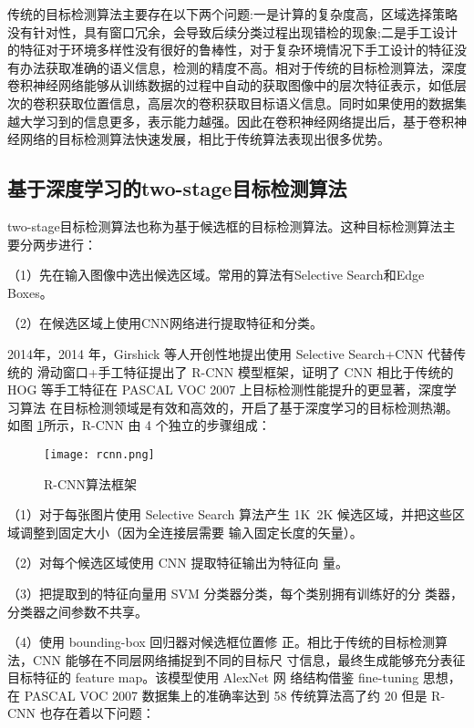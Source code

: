 传统的目标检测算法主要存在以下两个问题:一是计算的复杂度高，区域选择策略没有针对性，具有窗口冗余，会导致后续分类过程出现错检的现象;二是手工设计的特征对于环境多样性没有很好的鲁棒性，对于复杂环境情况下手工设计的特征没有办法获取准确的语义信息，检测的精度不高。相对于传统的目标检测算法，深度卷积神经网络能够从训练数据的过程中自动的获取图像中的层次特征表示，如低层次的卷积获取位置信息，高层次的卷积获取目标语义信息。同时如果使用的数据集越大学习到的信息更多，表示能力越强。因此在卷积神经网络提出后，基于卷积神经网络的目标检测算法快速发展，相比于传统算法表现出很多优势。

\subsection{基于深度学习的two-stage目标检测算法}
two-stage目标检测算法也称为基于候选框的目标检测算法。这种目标检测算法主要分两步进行：

（1）先在输入图像中选出候选区域。常用的算法有Selective Search和Edge Boxes。

（2）在候选区域上使用CNN网络进行提取特征和分类。

2014年，2014 年，Girshick 等人开创性地提出使用 Selective Search+CNN 代替传统的
滑动窗口+手工特征提出了 R-CNN 模型框架\cite{girshick2014rich}，证明了 CNN 相比于传统的 HOG
等手工特征在 PASCAL VOC 2007 上目标检测性能提升的更显著，深度学习算法
在目标检测领域是有效和高效的，开启了基于深度学习的目标检测热潮。如图
\ref{rcnn}所示，R-CNN 由 4 个独立的步骤组成：

\begin{figure}[htbp]
    \centering
    \texttt{[image: rcnn.png]}
    \caption{R-CNN算法框架}
    \label{rcnn}
\end{figure}

（1）对于每张图片使用 Selective Search
算法产生 1K~2K 候选区域，并把这些区域调整到固定大小（因为全连接层需要
输入固定长度的矢量）。

（2）对每个候选区域使用 CNN 提取特征输出为特征向
量。

（3）把提取到的特征向量用 SVM 分类器分类，每个类别拥有训练好的分
类器，分类器之间参数不共享。

（4）使用 bounding-box 回归器对候选框位置修
正。相比于传统的目标检测算法，CNN 能够在不同层网络捕捉到不同的目标尺
寸信息，最终生成能够充分表征目标特征的 feature map。该模型使用 AlexNet 网
络结构借鉴 fine-tuning 思想，在 PASCAL VOC 2007 数据集上的准确率达到 58%
传统算法高了约 20%
但是 R-CNN 也存在着以下问题：

